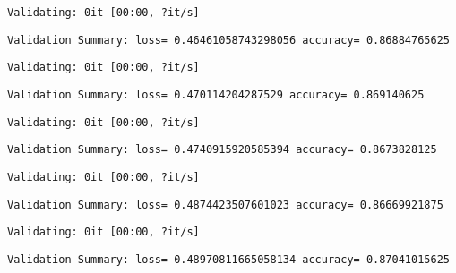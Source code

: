 \documentclass[11pt]{article}
\begin{document}
    
    \begin{Verbatim}[commandchars=\\\{\}]
Validating: 0it [00:00, ?it/s]
    \end{Verbatim}

    
    \begin{Verbatim}[commandchars=\\\{\}]
Validation Summary: loss= 0.46461058743298056 accuracy= 0.86884765625
    \end{Verbatim}

    
    \begin{Verbatim}[commandchars=\\\{\}]
Validating: 0it [00:00, ?it/s]
    \end{Verbatim}

    
    \begin{Verbatim}[commandchars=\\\{\}]
Validation Summary: loss= 0.470114204287529 accuracy= 0.869140625
    \end{Verbatim}

    
    \begin{Verbatim}[commandchars=\\\{\}]
Validating: 0it [00:00, ?it/s]
    \end{Verbatim}

    
    \begin{Verbatim}[commandchars=\\\{\}]
Validation Summary: loss= 0.4740915920585394 accuracy= 0.8673828125
    \end{Verbatim}

    
    \begin{Verbatim}[commandchars=\\\{\}]
Validating: 0it [00:00, ?it/s]
    \end{Verbatim}

    
    \begin{Verbatim}[commandchars=\\\{\}]
Validation Summary: loss= 0.4874423507601023 accuracy= 0.86669921875
    \end{Verbatim}

    
    \begin{Verbatim}[commandchars=\\\{\}]
Validating: 0it [00:00, ?it/s]
    \end{Verbatim}

    
    \begin{Verbatim}[commandchars=\\\{\}]
Validation Summary: loss= 0.48970811665058134 accuracy= 0.87041015625
    \end{Verbatim}
\end{document}
